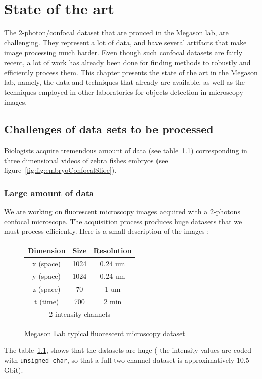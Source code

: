 
%
%


\chapter{State of the art}

The 2-photon/confocal dataset that are prouced in the Megason lab, are challenging.
They represent a lot of data, and have several artifacts that make image processing much harder.
Even though such confocal datasets are fairly recent, a lot of work has already been done for finding methods to robustly and efficiently process them.
This chapter presents the state of the art in the Megason lab,
namely, the data and techniques that already are available, as well as the techniques employed in other laboratories for objects detection in microscopy images.



\section{Challenges of data sets to be processed}
\label{setc:ChallengesData}
Biologists acquire tremendous amount of data (see table~\ref{tab:DataSizes})
corresponding in three dimensional videos of zebra fishes embryos
(see figure~\ref{fig:fig:embryoConfocalSlice}).

\subsection{Large amount of data}


We are working on fluorescent microscopy images acquired with a 2-photons confocal microscope. The acquisition process produces huge datasets that we must process efficiently.
Here is a small description of the images :
\begin{figure}[htb]
\begin{center}
\begin{tabular}{|c|c|c|}
\hline Dimension & Size & Resolution \\ 
\hline x (space) & 1024 & 0.24 um \\ 
\hline y (space) & 1024 & 0.24 um \\ 
\hline z (space) & 70 & 1 um \\ 
\hline t (time) & 700 & 2 min\\ 
\hline \multicolumn{3}{|c|}{ 2 intensity channels} \\ 
\hline
\end{tabular} 
\end{center}
\caption{Megason Lab typical fluorescent microscopy dataset}
\label{tab:DataSizes}
\end{figure}
The table~\ref{tab:DataSizes}, shows that the datasets are huge ( the intensity values are coded with {\verb+unsigned char+}, so that a full two channel dataset is approximatively  10.5 Gbit).

